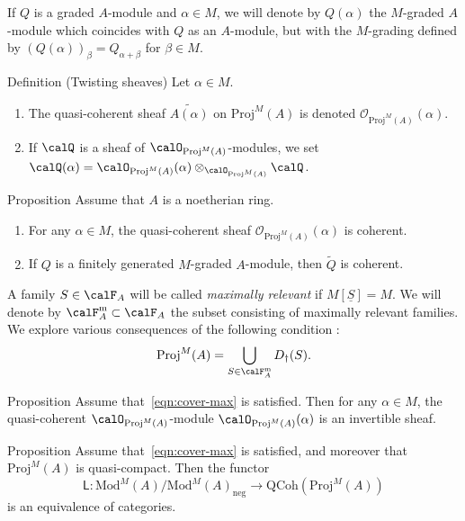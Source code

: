 \documentclass[9pt]{beamer}
\begin{document}
\begin{frame}{}

If $Q$ is a graded $A$-module and $\alpha \in M$, we will denote by $Q(\alpha)$ the $M$-graded $A$-module which coincides with $Q$ as an $A$-module, but with the $M$-grading defined by $(Q(\alpha))_\beta = Q_{\alpha+\beta}$ for $\beta \in M$.


\begin{block}{Definition (Twisting sheaves)}
Let $\alpha \in M$.
\begin{enumerate}
\item
The quasi-coherent sheaf $\widetilde{A(\alpha)}$ on $\mathrm{Proj}^M(A)$ is 
denoted $\mathcal{O}_{\mathrm{Proj}^M(A)} (\alpha)$.
\item
If $\calQ$ is a sheaf of $\calO_{\mathrm{Proj}^M(A)}$-modules, we set $\calQ (\alpha) = \calO_{\mathrm{Proj}^M(A)} (\alpha ) \otimes_{\calO_{\mathrm{Proj}^M(A)}} \calQ$.
\end{enumerate}
\end{block}


\begin{block}{Proposition}
Assume that $A$ is a noetherian ring.
\begin{enumerate}
\item
For any $\alpha \in M$, the quasi-coherent sheaf $\mathcal{O}_{\mathrm{Proj}^M(A)} (\alpha)$ is coherent.
\item
If $Q$ is a finitely generated $M$-graded $A$-module, then $\widetilde{Q}$ is coherent.
\end{enumerate}
\end{block}


\end{frame}

\begin{frame}

A family $S \in \calF_A$ will be called \emph{maximally relevant} if $M[\underline{S}]=M$.   We will denote by $\calF_A^{\mathrm{m}} \subset \calF_A$ the subset consisting of maximally relevant families. We explore various consequences of the following condition :
\begin{equation}
\label{eqn:cover-max}
\mathrm{Proj}^M(A) = \bigcup_{S \in \calF_A^{\mathrm{m}}} D_\dag(S).
\end{equation}


\begin{block}{Proposition}
Assume that~\eqref{eqn:cover-max} is satisfied. Then for any $ \alpha \in M$, the quasi-coherent $\calO_{\mathrm{Proj}^M(A)}$-module $\calO_{\mathrm{Proj}^M(A)} (\alpha)$ is an invertible sheaf.
\end{block}

\begin{block}{Proposition}
Assume that~\eqref{eqn:cover-max} is satisfied, and moreover that $\mathrm{Proj}^M(A)$ is quasi-compact. Then the functor
\[
\mathsf{L} : \mathrm{Mod}^M(A) / \mathrm{Mod}^M(A)_{\mathrm{neg}} \to \mathrm{QCoh}(\mathrm{Proj}^M(A))
\]
is an equivalence of categories.
\end{block}
\end{frame}
\end{document}
